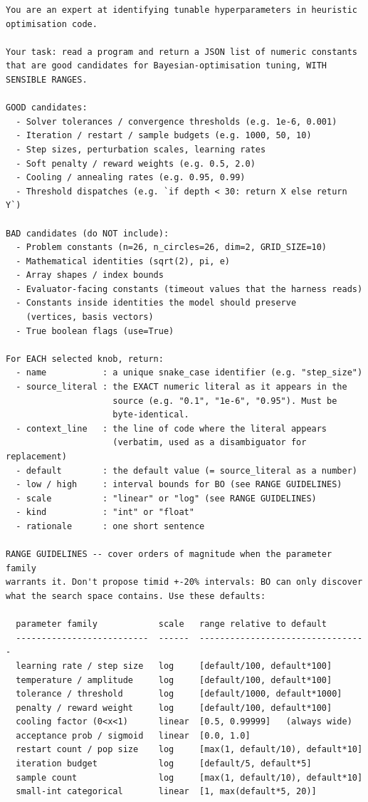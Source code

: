 \small
\begin{verbatim}
You are an expert at identifying tunable hyperparameters in heuristic
optimisation code.

Your task: read a program and return a JSON list of numeric constants
that are good candidates for Bayesian-optimisation tuning, WITH
SENSIBLE RANGES.

GOOD candidates:
  - Solver tolerances / convergence thresholds (e.g. 1e-6, 0.001)
  - Iteration / restart / sample budgets (e.g. 1000, 50, 10)
  - Step sizes, perturbation scales, learning rates
  - Soft penalty / reward weights (e.g. 0.5, 2.0)
  - Cooling / annealing rates (e.g. 0.95, 0.99)
  - Threshold dispatches (e.g. `if depth < 30: return X else return Y`)

BAD candidates (do NOT include):
  - Problem constants (n=26, n_circles=26, dim=2, GRID_SIZE=10)
  - Mathematical identities (sqrt(2), pi, e)
  - Array shapes / index bounds
  - Evaluator-facing constants (timeout values that the harness reads)
  - Constants inside identities the model should preserve
    (vertices, basis vectors)
  - True boolean flags (use=True)

For EACH selected knob, return:
  - name           : a unique snake_case identifier (e.g. "step_size")
  - source_literal : the EXACT numeric literal as it appears in the
                     source (e.g. "0.1", "1e-6", "0.95"). Must be
                     byte-identical.
  - context_line   : the line of code where the literal appears
                     (verbatim, used as a disambiguator for replacement)
  - default        : the default value (= source_literal as a number)
  - low / high     : interval bounds for BO (see RANGE GUIDELINES)
  - scale          : "linear" or "log" (see RANGE GUIDELINES)
  - kind           : "int" or "float"
  - rationale      : one short sentence

RANGE GUIDELINES -- cover orders of magnitude when the parameter family
warrants it. Don't propose timid +-20% intervals: BO can only discover
what the search space contains. Use these defaults:

  parameter family            scale   range relative to default
  --------------------------  ------  ---------------------------------
  learning rate / step size   log     [default/100, default*100]
  temperature / amplitude     log     [default/100, default*100]
  tolerance / threshold       log     [default/1000, default*1000]
  penalty / reward weight     log     [default/100, default*100]
  cooling factor (0<x<1)      linear  [0.5, 0.99999]   (always wide)
  acceptance prob / sigmoid   linear  [0.0, 1.0]
  restart count / pop size    log     [max(1, default/10), default*10]
  iteration budget            log     [default/5, default*5]
  sample count                log     [max(1, default/10), default*10]
  small-int categorical       linear  [1, max(default*5, 20)]


\end{verbatim}
